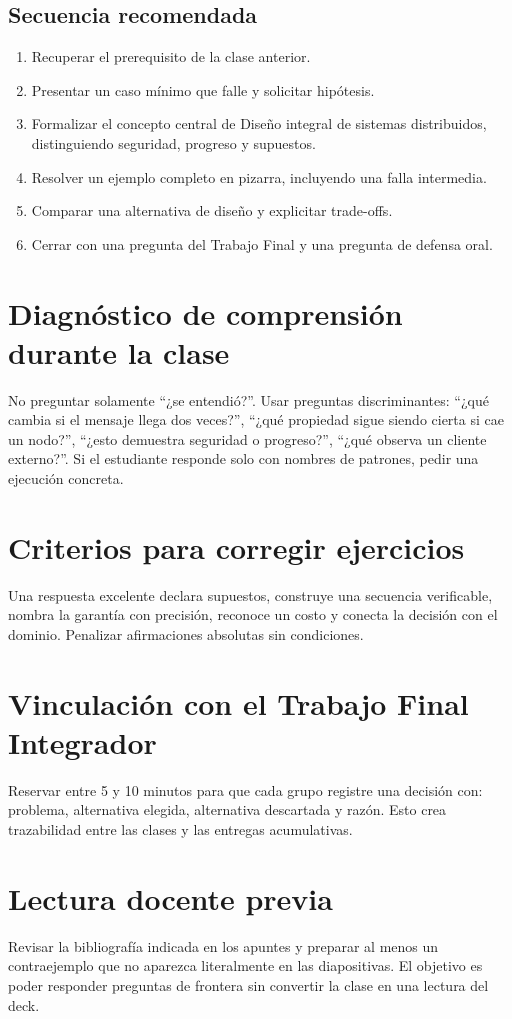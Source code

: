 \documentclass[variant=docente,cover=institutional,mode=screen]{ua-engineering-v6-article}
\begin{document}
\subsection*{Secuencia recomendada}
\begin{enumerate}
\item Recuperar el prerequisito de la clase anterior.
\item Presentar un caso mínimo que falle y solicitar hipótesis.
\item Formalizar el concepto central de Diseño integral de sistemas distribuidos, distinguiendo seguridad, progreso y supuestos.
\item Resolver un ejemplo completo en pizarra, incluyendo una falla intermedia.
\item Comparar una alternativa de diseño y explicitar trade-offs.
\item Cerrar con una pregunta del Trabajo Final y una pregunta de defensa oral.
\end{enumerate}
\section{Diagnóstico de comprensión durante la clase}
No preguntar solamente ``¿se entendió?''. Usar preguntas discriminantes: ``¿qué cambia si el mensaje llega dos veces?'', ``¿qué propiedad sigue siendo cierta si cae un nodo?'', ``¿esto demuestra seguridad o progreso?'', ``¿qué observa un cliente externo?''. Si el estudiante responde solo con nombres de patrones, pedir una ejecución concreta.
\section{Criterios para corregir ejercicios}
Una respuesta excelente declara supuestos, construye una secuencia verificable, nombra la garantía con precisión, reconoce un costo y conecta la decisión con el dominio. Penalizar afirmaciones absolutas sin condiciones.
\section{Vinculación con el Trabajo Final Integrador}
Reservar entre 5 y 10 minutos para que cada grupo registre una decisión con: problema, alternativa elegida, alternativa descartada y razón. Esto crea trazabilidad entre las clases y las entregas acumulativas.
\section{Lectura docente previa}
Revisar la bibliografía indicada en los apuntes y preparar al menos un contraejemplo que no aparezca literalmente en las diapositivas. El objetivo es poder responder preguntas de frontera sin convertir la clase en una lectura del deck.
\end{document}
